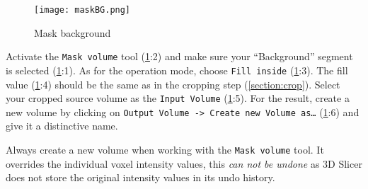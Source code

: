 \pagebreak
\begin{figure}[h!]
	\centerline{
		\texttt{[image: maskBG.png]}}
	\caption{Mask background}\label{fig:mBG}
\end{figure}
\noindent
Activate the \texttt{Mask volume} tool (\cref{fig:mBG}:2) and make sure your ``Background'' segment is selected (\cref{fig:mBG}:1).
As for the operation mode, choose \texttt{Fill inside} (\cref{fig:mBG}:3).
The fill value (\cref{fig:mBG}:4) should be the same as in the cropping step (\cref{section:crop}).
Select your cropped source volume as the \texttt{Input Volume} (\cref{fig:mBG}:5).
For the result, create a new volume by clicking on \texttt{Output Volume -> Create new Volume as\ldots} (\cref{fig:mBG}:6) and give it a distinctive name.
\newline %
\newline
\begin{minipage}{0.4\textwidth}
	\begin{center}
		
	\end{center}
\end{minipage}%
%
\begin{minipage}{0.5\textwidth}
	Always create a new volume when working with the \texttt{Mask volume} tool.
	It overrides the individual voxel intensity values, this \emph{can not be undone} as 3D Slicer does not store the original intensity values in its undo history.
\end{minipage}
\pagebreak

